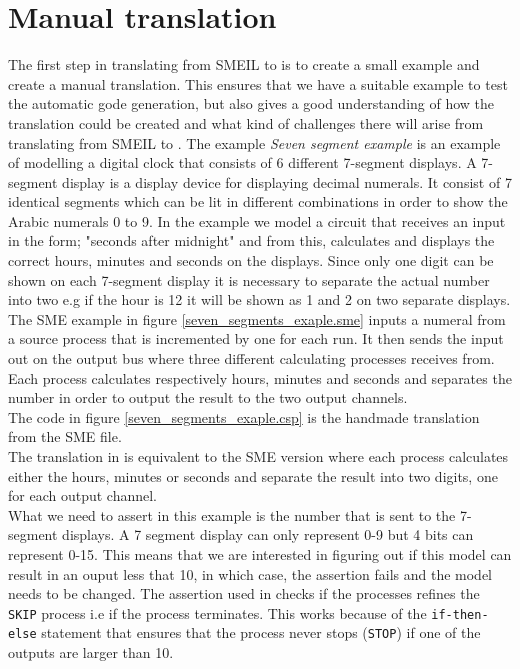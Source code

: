 \section{Manual translation}
The first step in translating from SMEIL to \cspm is to create a small example and create a manual translation. This ensures that we have a suitable example to test the automatic gode generation, but also gives a good understanding of how the translation could be created and what kind of challenges there will arise from translating from SMEIL to \cspm.
The example \textit{Seven segment example} is an example of modelling a digital clock that consists of 6 different 7-segment displays. A 7-segment display is a display device for displaying decimal numerals. It consist of 7 identical segments which can be lit in different combinations in order to show the Arabic numerals 0 to 9. In the example we model a circuit that receives an input in the form; "seconds after midnight" and from this, calculates and displays the correct hours, minutes and seconds on the displays. Since only one digit can be shown on each 7-segment display it is necessary to separate the actual number into two e.g if the hour is 12 it will be shown as 1 and 2 on two separate displays. \\ The SME example in figure \ref{seven_segments_exaple.sme} inputs a numeral from a source process that is incremented by one for each run. It then sends the input out on the output bus where three different calculating processes receives from. Each process calculates respectively hours, minutes and seconds and separates the number in order to output the result to the two output channels. \\ The \cspm code in figure \ref{seven_segments_exaple.csp} is the handmade translation from the SME file. \\ The translation in \cspm is equivalent to the SME version where each process calculates either the hours, minutes or seconds and separate the result into two digits, one for each output channel.\\
What we need to assert in this example is the number that is sent to the 7-segment displays. A 7 segment display can only represent 0-9 but 4 bits can represent 0-15. This means that we are interested in figuring out if this model can result in an ouput less that 10, in which case, the assertion fails and the model needs to be changed. The assertion used in \cspm checks if the processes refines the \texttt{SKIP} process i.e if the process terminates. This works because of the \texttt{if-then-else} statement that ensures that the process never stops (\texttt{STOP}) if one of the outputs are larger than 10. \\\\
